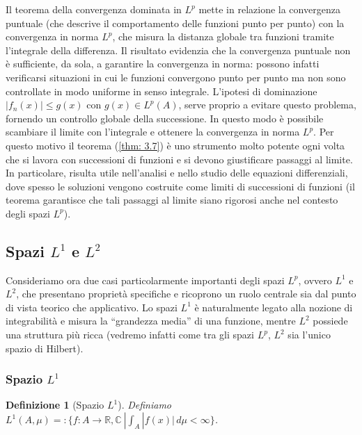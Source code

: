 \documentclass[a4paper,12pt]{report}
\newtheorem{definizione}{Definizione}[chapter]
\newcommand{\lt}{<}
\begin{document}
Il teorema della convergenza dominata in $L^p$ mette in relazione la convergenza puntuale (che descrive il comportamento delle funzioni punto per punto) con la convergenza in norma $L^p$, che misura la distanza globale tra funzioni tramite l’integrale della differenza. Il risultato evidenzia che la convergenza puntuale non è sufficiente, da sola, a garantire la convergenza in norma: possono infatti verificarsi situazioni in cui le funzioni convergono punto per punto ma non sono controllate in modo uniforme in senso integrale. L’ipotesi di dominazione $|f_n(x)|\leq g(x)$ con $g(x)\in L^p(A)$, serve proprio a evitare questo problema, fornendo un controllo globale della successione. In questo modo è possibile scambiare il limite con l’integrale e ottenere la convergenza in norma $L^p$. Per questo motivo il teorema (\ref{thm: 3.7}) è uno strumento molto potente ogni volta che si lavora con successioni di funzioni e si devono giustificare passaggi al limite. In particolare, risulta utile  nell’analisi e nello studio delle equazioni differenziali, dove spesso le soluzioni vengono costruite come limiti di successioni di funzioni (il teorema garantisce che tali passaggi al limite siano rigorosi anche nel contesto degli spazi $L^p$).
\vspace{0.05cm}
\subsection{Spazi $L^1$ e $L^2$}

Consideriamo ora due casi particolarmente importanti degli spazi $L^p$, ovvero $L^1$ e $L^2$, che presentano proprietà specifiche e ricoprono un ruolo centrale sia dal punto di vista teorico che applicativo. Lo spazi $L^1$ è naturalmente legato alla nozione di integrabilità e misura la “grandezza media” di una funzione, mentre $L^2$ possiede una struttura più ricca (vedremo infatti come tra gli spazi $L^p$, $L^2$ sia l'unico spazio di Hilbert). 

\newpage

\subsubsection{\Large Spazio $L^1$}

\begin{definizione}[Spazio $L^1$]
    Definiamo \mbox{$L^1(A,\mu)=:\bigg\{f:A\to \mathbb{R,C} \ |\displaystyle\int_A|f (x) |\,d\mu\lt\infty\bigg\}$.}
\end{definizione}
\end{document}

